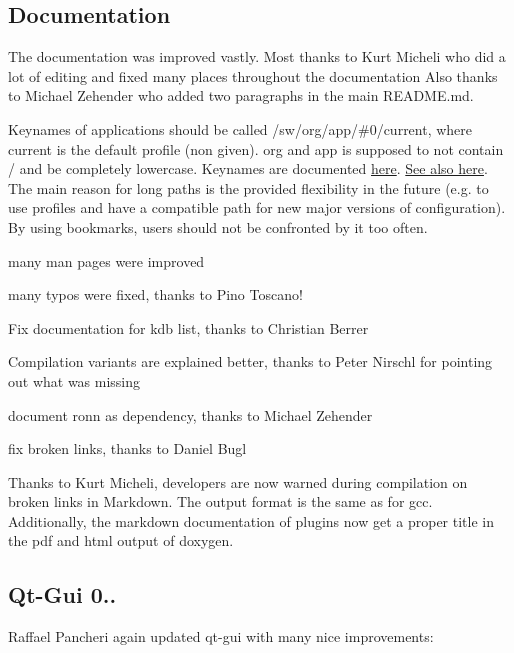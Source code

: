 \subsection*{Documentation}

The documentation was improved vastly. Most thanks to Kurt Micheli who did a lot of editing and fixed many places throughout the documentation Also thanks to Michael Zehender who added two paragraphs in the main R\+E\+A\+D\+M\+E.\+md.

Keynames of applications should be called {\ttfamily /sw/org/app/\#0/current}, where {\ttfamily current} is the default profile (non given). {\ttfamily org} and {\ttfamily app} is supposed to not contain {\ttfamily /} and be completely lowercase. Keynames are documented \hyperlink{md_doc_help_elektra-key-names_doc_help_elektra-key-names_md}{here}. \hyperlink{doc_tutorials_application-integration_md}{See also here}. The main reason for long paths is the provided flexibility in the future (e.\+g. to use profiles and have a compatible path for new major versions of configuration). By using bookmarks, users should not be confronted by it too often.


\begin{DoxyItemize}
\item many man pages were improved
\item many typos were fixed, thanks to Pino Toscano!
\item Fix documentation for kdb list, thanks to Christian Berrer
\item Compilation variants are explained better, thanks to Peter Nirschl for pointing out what was missing
\item document ronn as dependency, thanks to Michael Zehender
\item fix broken links, thanks to Daniel Bugl
\end{DoxyItemize}

Thanks to Kurt Micheli, developers are now warned during compilation on broken links in Markdown. The output format is the same as for gcc. Additionally, the markdown documentation of plugins now get a proper title in the pdf and html output of doxygen.

\subsection*{Qt-\/\+Gui 0..}

Raffael Pancheri again updated qt-\/gui with many nice improvements\+:


